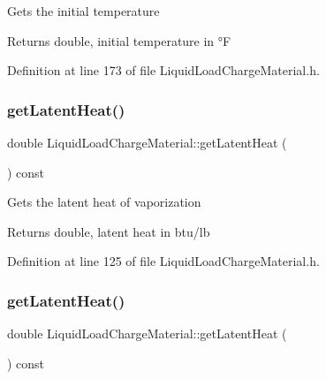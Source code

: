 Gets the initial temperature \begin{DoxyReturn}{Returns}
double, initial temperature in °F 
\end{DoxyReturn}


Definition at line 173 of file Liquid\+Load\+Charge\+Material.\+h.

\mbox{\label{class_liquid_load_charge_material_aca3a38eb3343144042e9349b053da1bc}} 
\subsubsection{\texorpdfstring{get\+Latent\+Heat()}{getLatentHeat()}\hspace{0.1cm}{\footnotesize\ttfamily [1/3]}}
{\footnotesize\ttfamily double Liquid\+Load\+Charge\+Material\+::get\+Latent\+Heat (\begin{DoxyParamCaption}{ }\end{DoxyParamCaption}) const\hspace{0.3cm}{\ttfamily [inline]}}

Gets the latent heat of vaporization \begin{DoxyReturn}{Returns}
double, latent heat in btu/lb 
\end{DoxyReturn}


Definition at line 125 of file Liquid\+Load\+Charge\+Material.\+h.

\mbox{\label{class_liquid_load_charge_material_aca3a38eb3343144042e9349b053da1bc}} 
\subsubsection{\texorpdfstring{get\+Latent\+Heat()}{getLatentHeat()}\hspace{0.1cm}{\footnotesize\ttfamily [2/3]}}
{\footnotesize\ttfamily double Liquid\+Load\+Charge\+Material\+::get\+Latent\+Heat (\begin{DoxyParamCaption}{ }\end{DoxyParamCaption}) const\hspace{0.3cm}{\ttfamily [inline]}}

